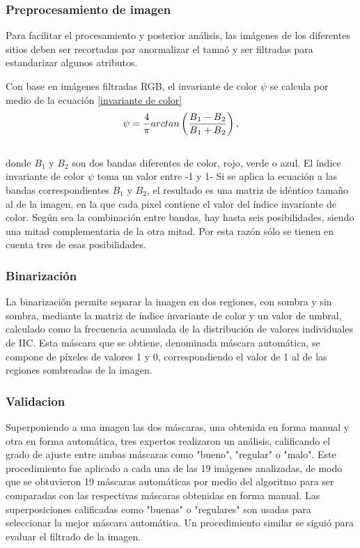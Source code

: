\subsubsection{Preprocesamiento de imagen} \label{Metodología}
Para facilitar el procesamiento y posterior análisis, las imágenes de los diferentes sitios deben ser recortadas par anormalizar el tamaó y ser filtradas para estandarizar algunos atributos.


Con base en imágenes filtradas RGB, el invariante de color $\psi$ se calcula por medio de la ecuación \ref{invariante de color}
\\
\begin{equation}
	\psi=\frac{4}{\pi} arctan\left(\frac{B\textsubscript{1}-B\textsubscript{2}}{B\textsubscript{1}+B\textsubscript{2}}\right),\label{invariante de color}
\end{equation}
\\
 donde $B_1$ y $B_2$ son dos bandas diferentes de color, rojo, verde o azul. El índice invariante de color $\psi$ toma un valor entre -1 y 1- Si se aplica la ecuación a las bandas correspondientes $B_1$ y $B_2$, el resultado es una matriz de idéntico tamaño al de la imagen, en la que cada pixel contiene el valor del índice invariante de color. Según sea la combinación entre bandas, hay hasta seis posibilidades, siendo una mitad complementaria de la otra mitad. Por esta razón sólo se tienen en cuenta tres de esas posibilidades.
\subsubsection{Binarización}
 La binarización permite separar la imagen en dos regiones, con sombra y sin sombra, mediante la matriz de índice invariante de color y un valor de umbral, calculado como la frecuencia acumulada de la distribución de valores individuales de IIC. Esta máscara que se obtiene, denominada máscara automática, se compone de píxeles de valores 1 y 0, correspondiendo el valor de 1 al de las regiones sombreadas de la imagen. 




\subsubsection{Validacion} \label{Validacion}
Superponiendo a una imagen las dos máscaras, una obtenida en forma manual y otra en forma automática, tres expertos realizaron un análisis, calificando el grado de ajuste entre ambas máscaras como "bueno", "regular" o "malo". Este procedimiento fue aplicado a cada una de las 19 imágenes analizadas, de modo que se obtuvieron 19 máscaras automáticas por medio del algoritmo para ser comparadas con las respectivas máscaras obtenidas en forma manual. Las superposiciones calificadas como "buenas" o "regulares" son usadas para seleccionar la mejor máscara automática. Un procedimiento similar se siguió para evaluar el filtrado de la imagen.


